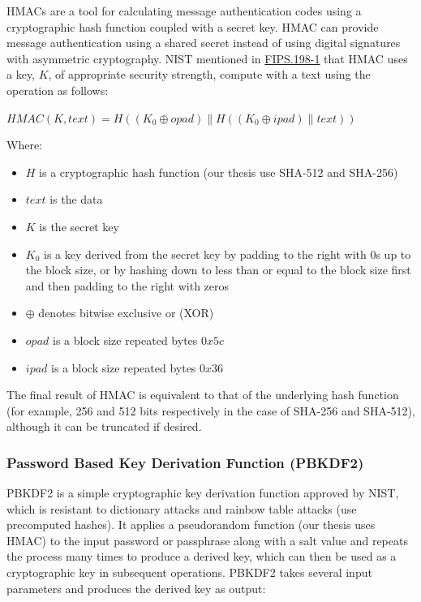 HMACs are a tool for calculating message authentication codes using a cryptographic hash function coupled with a secret key. HMAC can provide message authentication using a shared secret instead of using digital signatures with asymmetric cryptography. NIST mentioned in \href{https://nvlpubs.nist.gov/nistpubs/FIPS/NIST.FIPS.198-1.pdf}{FIPS.198-1} that HMAC uses a key, $K$, of appropriate security strength, compute with a text using the operation as follows:
\vspace{0.2cm}
\begin{center}
  $HMAC(K, text) = H((K_0 \oplus opad )\| H((K_0 \oplus ipad) \| text))$
\end{center}
\vspace{0.2cm}

Where:

\begin{itemize}
  \item $H$ is a cryptographic hash function (our thesis use SHA-512 and SHA-256)
  \item $text$ is the data
  \item $K$ is the secret key
  \item $K_0$ is a key derived from the secret key by padding to the right with 0s up to the block size, or by hashing down to less than or equal to the block size first and then padding to the right with zeros
  \item $\oplus$ denotes bitwise exclusive or (XOR)
  \item $opad$ is a block size repeated bytes $0x5c$
  \item $ipad$ is a block size repeated bytes $0x36$
\end{itemize}

The final result of HMAC is equivalent to that of the underlying hash function (for example, 256 and 512 bits respectively in the case of SHA-256 and SHA-512), although it can be truncated if desired.

\subsubsection{Password Based Key Derivation Function (PBKDF2)}

PBKDF2 is a simple cryptographic key derivation function approved by NIST, which is resistant to dictionary attacks and rainbow table attacks (use precomputed hashes). It applies a pseudorandom function (our thesis uses HMAC) to the input password or passphrase along with a salt value and repeats the process many times to produce a derived key, which can then be used as a cryptographic key in subsequent operations. PBKDF2 takes several input parameters and produces the derived key as output:


